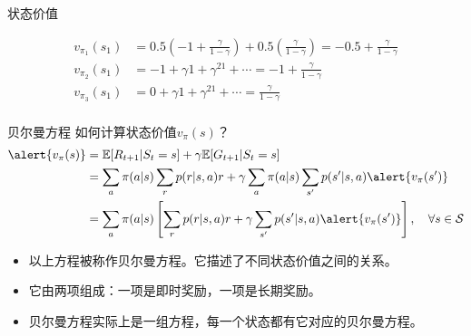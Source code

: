 \documentclass[aspectratio=169,xcolor=dvipsnames]{beamer}
\begin{document}
\begin{frame}{状态价值}
\begin{center}
    \end{center}
    \[
        \begin{aligned}
            v_{\pi_1}(s_1)&=0.5\left(-1+\frac{\gamma}{1-\gamma}\right)+0.5\left(\frac{\gamma}{1-\gamma}\right) = -0.5+\frac{\gamma}{1-\gamma}\\
            v_{\pi_2}(s_1)&=-1+\gamma1+\gamma^21+\cdots=-1+\frac{\gamma}{1-\gamma}\\
            v_{\pi_3}(s_1)&=0+\gamma1+\gamma^21+\cdots=\frac{\gamma}{1-\gamma} \\            
        \end{aligned}
    \]
\end{frame}

\begin{frame}{贝尔曼方程}
    如何计算状态价值$v_{\pi}(s)$？
    \[
        \begin{aligned}
            \alert{v_\pi(s)}&=\mathbb{E}[R_{t+1}|S_t=s]+\gamma\mathbb{E}[G_{t+1}|S_t=s] \\
            &=\sum_a\pi(a|s)\sum_r p(r|s,a)r+\gamma\sum_a\pi(a|s)\sum_{s'}p(s'|s,a)\alert{v_{\pi}(s')} \\
            &=\sum_a\pi(a|s)\left[\sum_r p(r|s,a)r+\gamma\sum_{s'}p(s'|s,a)\alert{v_{\pi}(s')}\right], \quad \forall s\in\mathcal{S}
        \end{aligned}
    \]
    \begin{itemize}
        \item 以上方程被称作贝尔曼方程。它描述了不同状态价值之间的关系。
        \item 它由两项组成：一项是即时奖励，一项是长期奖励。
        \item 贝尔曼方程实际上是一组方程，每一个状态都有它对应的贝尔曼方程。
    \end{itemize}
\end{frame}
\end{document}
